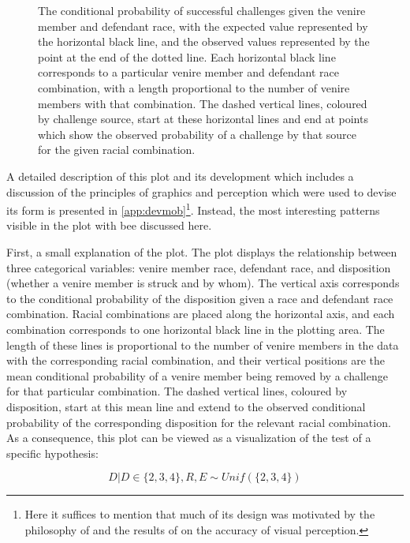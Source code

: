 \begin{figure}[!h]
  \centering
  \caption[The ``Mobile Plot'' of Racial Combination and Strikes]{The conditional probability of successful challenges given the
    venire member and defendant race, with the expected value represented by the horizontal black line, and the observed values
    represented by the point at the end of the dotted line. Each horizontal black line corresponds to a particular venire member
    and defendant race combination, with a length proportional to the number of venire members with that combination. The dashed
    vertical lines, coloured by challenge source, start at these horizontal lines and end at points which show the observed
    probability of a challenge by that source for the given racial combination.}
  \label{fig:racedefmob}
\end{figure}

A detailed description of this plot and its development which includes a discussion of the principles of graphics and perception
which were used to devise its form is presented in \ref{app:devmob}\footnote{Here it suffices to mention that much of its design
  was motivated by the philosophy of \cite{VisualDisplayQuant} and the results of \cite{cleveland1987} on the accuracy of visual
  perception.}. Instead, the most interesting patterns visible in the plot with bee discussed here.

First, a small explanation of the plot. The plot displays the relationship between three categorical variables: venire member
race, defendant race, and disposition (whether a venire member is struck and by whom). The vertical axis corresponds to the
conditional probability of the disposition given a race and defendant race combination. Racial combinations are placed along the
horizontal axis, and each combination corresponds to one horizontal black line in the plotting area. The length of these lines is
proportional to the number of venire members in the data with the corresponding racial combination, and their vertical positions
are the mean conditional probability of a venire member being removed by a challenge for that particular combination. The dashed
vertical lines, coloured by disposition, start at this mean line and extend to the observed conditional probability of the
corresponding disposition for the relevant racial combination. As a consequence, this plot can be viewed as a visualization of the
test of a specific hypothesis:

\begin{equation}
  \label{eq:vishyp}
  D | D \in \{2,3,4\}, R, E \sim Unif(\{2,3,4\})
\end{equation}

